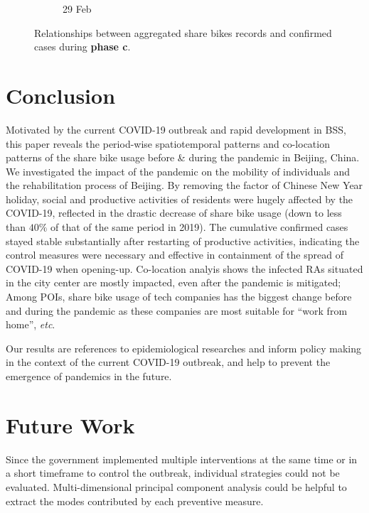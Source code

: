 \documentclass[ijgi,submit,moreauthors,pdftex]{Definitions/mdpi}
\begin{document}
\begin{figure}[!h]
\begin{subfigure}{.3\textwidth}
\begin{tikzpicture}[inner sep = 0pt]
        \end{tikzpicture}
        \caption{29 Feb}
        \label{fig:correlation_02_29}
    \end{subfigure}
    \caption{Relationships between aggregated share bikes records and confirmed cases during \textbf{phase c}.}
    \label{fig:BSS_phase_3}
\end{figure}


\section{Conclusion}

Motivated by the current COVID-19 outbreak and rapid development in BSS, this paper reveals the period-wise spatiotemporal patterns and co-location patterns of the share bike usage before \& during the pandemic in Beijing, China.
We investigated the impact of the pandemic on the mobility of individuals and the rehabilitation process of Beijing.
By removing the factor of Chinese New Year holiday, social and productive activities of residents were hugely affected by the COVID-19, reflected in the drastic decrease of share bike usage (down to less than $40\%$ of that of the same period in 2019). 
The cumulative confirmed cases stayed stable substantially after restarting of productive activities, indicating the control measures were necessary and effective in containment of the spread of COVID-19 when opening-up.
Co-location analyis shows the infected RAs situated in the city center are mostly impacted, even after the pandemic is mitigated;
Among POIs, share bike usage of tech companies has the biggest change before and during the pandemic as these companies are most suitable for ``work from home'', \textit{etc}.

Our results are references to epidemiological researches and inform policy making in the context of the current COVID-19 outbreak, and help to prevent the emergence of pandemics in the future.

\section{Future Work}

Since the government implemented multiple interventions at the same time or in a short timeframe to control the outbreak, individual strategies could not be evaluated.
Multi-dimensional principal component analysis could be helpful to extract the modes contributed by each preventive measure.
\end{document}
